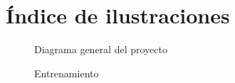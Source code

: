 \section{Índice de ilustraciones}

\begin{figure}[h]
    \centering
    
    \caption{Diagrama general del proyecto}
    \label{fig:general}
\end{figure}

\begin{figure}[h]
    \centering
    
    \caption{Entrenamiento}
    \label{fig:training}
\end{figure}